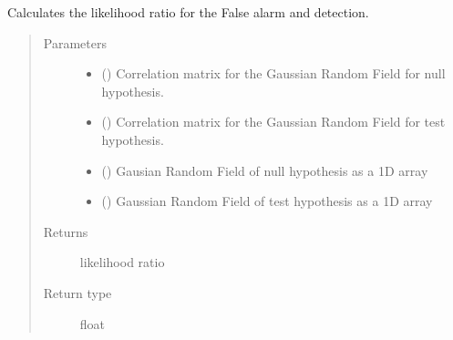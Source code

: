 \documentclass[letterpaper,10pt,english]{sphinxmanual}
\begin{document}

\begin{fulllineitems}
\label{\detokenize{utilities:utilities.likelihoodratio}}
\sphinxAtStartPar
Calculates the likelihood ratio for the False alarm and detection.
\begin{quote}\begin{description}
\item[{Parameters}] \leavevmode\begin{itemize}
\item {} 
\sphinxAtStartPar
{} () \textendash{} Correlation matrix for the Gaussian Random Field for null hypothesis.

\item {} 
\sphinxAtStartPar
{} () \textendash{} Correlation matrix for the Gaussian Random Field for test hypothesis.

\item {} 
\sphinxAtStartPar
{} () \textendash{} Gausian Random Field of null hypothesis as a 1\sphinxhyphen{}D array

\item {} 
\sphinxAtStartPar
{} () \textendash{} Gaussian Random Field of test hypothesis as a 1\sphinxhyphen{}D array

\end{itemize}

\item[{Returns}] \leavevmode
\sphinxAtStartPar
likelihood ratio

\item[{Return type}] \leavevmode
\sphinxAtStartPar
float

\end{description}\end{quote}

\end{fulllineitems}
\end{document}
